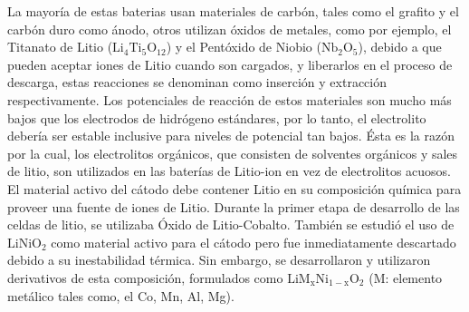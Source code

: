 \documentclass[10pt,a4paper]{article}
\begin{document}
    \noindent La mayoría de estas baterias usan materiales de carbón, 
    tales como el grafito y el carbón duro como ánodo, otros utilizan óxidos de 
    metales, como por ejemplo, el Titanato de Litio ($\mathrm{Li_4Ti_5O_{12}}$) 
    y el Pentóxido de Niobio ($\mathrm{Nb_2O_5}$), debido a que pueden aceptar 
    iones de Litio cuando son cargados, y liberarlos en el proceso de descarga, 
    estas reacciones se denominan como inserción y extracción respectivamente. 
    Los potenciales de reacción de estos materiales son mucho más bajos que los 
    electrodos de hidrógeno estándares, por lo tanto, el electrolito debería ser 
    estable inclusive para niveles de potencial tan bajos. Ésta es la razón por la 
    cual, los electrolitos orgánicos, que consisten de solventes orgánicos y 
    sales de litio, son utilizados en las baterías de Litio-ion en vez de 
    electrolitos acuosos.
	\clearpage
	\noindent El material activo del cátodo debe contener Litio en su composición química 
    para proveer una fuente de iones de Litio. Durante la primer etapa de 
    desarrollo de las celdas de litio, se utilizaba Óxido de Litio-Cobalto.
    También se estudió el uso de $\mathrm{LiNiO_2}$ como 
    material activo para el cátodo pero fue inmediatamente descartado debido a 
    su inestabilidad térmica. Sin embargo, se desarrollaron y utilizaron 
    derivativos de esta composición, formulados como 
    $\mathrm{LiM_xNi_{1-x}O_2}$ (M: elemento metálico tales como, el Co, Mn, 
    Al, Mg).
	
\end{document}
